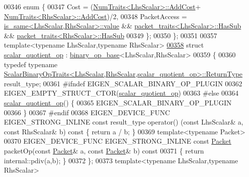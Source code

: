 \begin{DoxyCode}
00346   \textcolor{keyword}{enum} \{
00347     Cost = (\hyperlink{group___core___module_struct_eigen_1_1_num_traits}{NumTraits<LhsScalar>::AddCost}+
      \hyperlink{group___core___module_struct_eigen_1_1_num_traits}{NumTraits<RhsScalar>::AddCost})/2,
00348     PacketAccess = \hyperlink{struct_eigen_1_1internal_1_1is__same}{is\_same<LhsScalar,RhsScalar>::value} && 
      \hyperlink{struct_eigen_1_1internal_1_1packet__traits}{packet\_traits<LhsScalar>::HasSub} && 
      \hyperlink{struct_eigen_1_1internal_1_1packet__traits}{packet\_traits<RhsScalar>::HasSub}
00349   \};
00350 \};
00351 
00357 \textcolor{keyword}{template}<\textcolor{keyword}{typename} LhsScalar,\textcolor{keyword}{typename} RhsScalar>
\hyperlink{struct_eigen_1_1internal_1_1scalar__quotient__op}{00358} \textcolor{keyword}{struct }\hyperlink{struct_eigen_1_1internal_1_1scalar__quotient__op}{scalar\_quotient\_op}  : \hyperlink{struct_eigen_1_1internal_1_1binary__op__base}{binary\_op\_base}<LhsScalar,RhsScalar>
00359 \{
00360   \textcolor{keyword}{typedef} \textcolor{keyword}{typename} 
      \hyperlink{group___core___module_struct_eigen_1_1_scalar_binary_op_traits}{ScalarBinaryOpTraits<LhsScalar,RhsScalar,scalar\_quotient\_op>::ReturnType}
       result\_type;
00361 \textcolor{preprocessor}{#ifndef EIGEN\_SCALAR\_BINARY\_OP\_PLUGIN}
00362   EIGEN\_EMPTY\_STRUCT\_CTOR(\hyperlink{struct_eigen_1_1internal_1_1scalar__quotient__op}{scalar\_quotient\_op})
00363 \textcolor{preprocessor}{#else}
00364   \hyperlink{struct_eigen_1_1internal_1_1scalar__quotient__op}{scalar\_quotient\_op}() \{
00365     EIGEN\_SCALAR\_BINARY\_OP\_PLUGIN
00366   \}
00367 \textcolor{preprocessor}{#endif}
00368   EIGEN\_DEVICE\_FUNC EIGEN\_STRONG\_INLINE \textcolor{keyword}{const} result\_type operator() (\textcolor{keyword}{const} LhsScalar& a, \textcolor{keyword}{const} RhsScalar& 
      b)\textcolor{keyword}{ const }\{ \textcolor{keywordflow}{return} a / b; \}
00369   \textcolor{keyword}{template}<\textcolor{keyword}{typename} Packet>
00370   EIGEN\_DEVICE\_FUNC EIGEN\_STRONG\_INLINE \textcolor{keyword}{const} \hyperlink{union_eigen_1_1internal_1_1_packet}{Packet} packetOp(\textcolor{keyword}{const} \hyperlink{union_eigen_1_1internal_1_1_packet}{Packet}& a, \textcolor{keyword}{const} 
      \hyperlink{union_eigen_1_1internal_1_1_packet}{Packet}& b)\textcolor{keyword}{ const}
00371 \textcolor{keyword}{  }\{ \textcolor{keywordflow}{return} internal::pdiv(a,b); \}
00372 \};
00373 \textcolor{keyword}{template}<\textcolor{keyword}{typename} LhsScalar,\textcolor{keyword}{typename} RhsScalar>

\end{DoxyCode}
